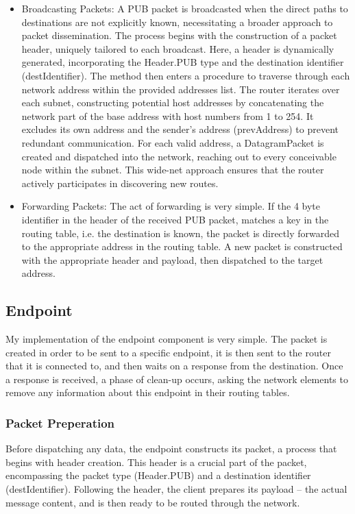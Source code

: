 \documentclass{article}
\begin{document}
\begin{itemize}
	\item Broadcasting Packets: A PUB packet is broadcasted when the direct paths to destinations are not explicitly known, necessitating a broader approach to packet dissemination. The process begins with the construction of a packet header, uniquely tailored to each broadcast. Here, a header is dynamically generated, incorporating the Header.PUB type and the destination identifier (destIdentifier). The method then enters a procedure to traverse through each network address within the provided addresses list. The router iterates over each subnet, constructing potential host addresses by concatenating the network part of the base address with host numbers from 1 to 254. It excludes its own address and the sender's address (prevAddress) to prevent redundant communication. For each valid address, a DatagramPacket is created and dispatched into the network, reaching out to every conceivable node within the subnet. This wide-net approach ensures that the router actively participates in discovering new routes.
	\item Forwarding Packets: The act of forwarding is very simple. If the 4 byte identifier in the header of the received PUB packet, matches a key in the routing table, i.e. the destination is known, the packet is directly forwarded to the appropriate address in the routing table. A new packet is constructed with the appropriate header and payload, then dispatched to the target address.

\end{itemize}

\subsection{Endpoint}

My implementation of the endpoint component is very simple. The packet is created in order to be sent to a specific endpoint, it is then sent to the router that it is connected to, and then waits on a response from the destination. Once a response is received, a phase of clean-up occurs, asking the network elements to remove any information about this endpoint in their routing tables.

\subsubsection*{Packet Preperation}
Before dispatching any data, the endpoint constructs its packet, a process that begins with header creation. This header is a crucial part of the packet, encompassing the packet type (Header.PUB) and a destination identifier (destIdentifier). Following the header, the client prepares its payload – the actual message content, and is then ready to be routed through the network.
\end{document}
